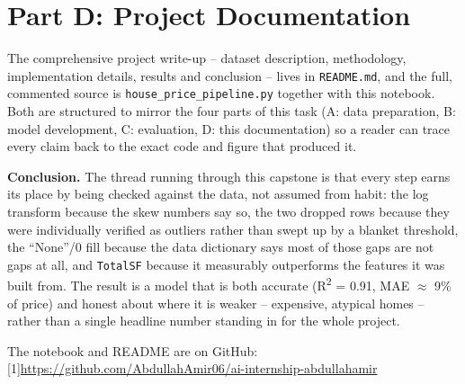 \documentclass[11pt,a4paper]{article}
\begin{document}
\section*{Part D: Project Documentation}

The comprehensive project write-up -- dataset description, methodology, implementation
details, results and conclusion -- lives in \texttt{README.md}, and the full, commented
source is \texttt{house\_price\_\allowbreak pipeline.py} together with this notebook. Both are
structured to mirror the four parts of this task (A: data preparation, B: model
development, C: evaluation, D: this documentation) so a reader can trace every claim
back to the exact code and figure that produced it.

\textbf{Conclusion.} The thread running through this capstone is that every step earns
its place by being checked against the data, not assumed from habit: the log transform
because the skew numbers say so, the two dropped rows because they were individually
verified as outliers rather than swept up by a blanket threshold, the ``None''/0 fill
because the data dictionary says most of those gaps are not gaps at all, and
\texttt{TotalSF} because it measurably outperforms the features it was built from. The
result is a model that is both accurate (R\textsuperscript{2} = 0.91, MAE
$\approx$ 9\% of price) and honest about where it is weaker -- expensive, atypical
homes -- rather than a single headline number standing in for the whole project.

\vspace{0.4cm}
\noindent The notebook and README are on GitHub: {\small\scalebox{0.72}[1]{\url{https://github.com/AbdullahAmir06/ai-internship-abdullahamir}}}
\end{document}
